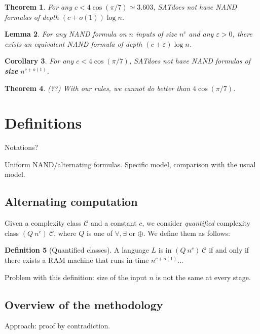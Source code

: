 \documentclass[a4paper, 12pt]{article}
\theoremstyle{plain}
\newtheorem{theorem}{Theorem}[section] %
\newtheorem{lemma}[theorem]{Lemma}
\newtheorem{corollary}[theorem]{Corollary}
\theoremstyle{definition}
\newtheorem{definition}[theorem]{Definition}
\theoremstyle{remark}
\newcommand{\Cc}{\mathcal{C}}%
\newcommand{\eps}{\varepsilon}%
\newcommand{\SAT}{\textsf{SAT}}%
\newcommand{\NAND}{\textsf{NAND}}%
\begin{document}
\begin{theorem}
	For any $c < 4 \cos(\pi/7) \simeq 3.603$, \SAT does not have \NAND{} formulas of depth $(c + o(1)) \log n$.
\end{theorem}

\begin{lemma}
	For any \NAND{} formula on $n$ inputs of size $n^c$ and any $\eps > 0$, 
	there exists an equivalent \NAND{} formula of depth $(c+\eps) \log n$.
\end{lemma}

\begin{corollary}
	For any $c < 4 \cos(\pi/7)$, \SAT does not have \NAND{} formulas of \textbf{size} $n^{c + o(1)}$.
\end{corollary}

\begin{theorem} (??)
	With our rules, we cannot do better than $4 \cos(\pi/7)$.
\end{theorem}

\section{Definitions}
Notations?

Uniform \NAND{}/alternating formulas. Specific model, comparison with the usual model.

\subsection{Alternating computation}

Given a complexity class $\Cc$ and a constant $c$, we consider \textit{quantified} complexity
class $(Q~n^c)~\Cc$, where $Q$ is one of $\forall, \exists$ or $\oplus$.
We define them as follows:
\begin{definition}[Quantified classes]
	A language $L$ is in $(Q~n^c)~\Cc$ if and only if there exists a RAM machine
	that runs in time $n^{c + o(1)}$...

	Problem with this definition: size of the input $n$ is not the same at every stage.
\end{definition}

\subsection{Overview of the methodology}
Approach: proof by contradiction.
\end{document}
